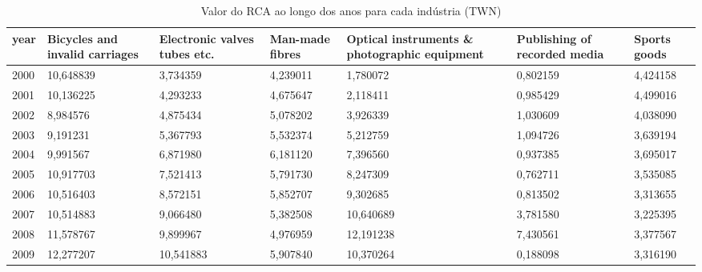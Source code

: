 \begin{table}
\centering
\caption{Valor do RCA ao longo dos anos para cada indústria (TWN)}
\begin{tabular}{p{1cm}p{2cm}p{2cm}p{2cm}p{2cm}p{2cm}p{2cm}}
\toprule
 year &  Bicycles and invalid carriages &  Electronic valves tubes etc. &  Man-made fibres &  Optical instruments \& photographic equipment &  Publishing of recorded media &  Sports goods \\
\midrule
 2000 &                       10,648839 &                      3,734359 &         4,239011 &                                      1,780072 &                      0,802159 &      4,424158 \\
 2001 &                       10,136225 &                      4,293233 &         4,675647 &                                      2,118411 &                      0,985429 &      4,499016 \\
 2002 &                        8,984576 &                      4,875434 &         5,078202 &                                      3,926339 &                      1,030609 &      4,038090 \\
 2003 &                        9,191231 &                      5,367793 &         5,532374 &                                      5,212759 &                      1,094726 &      3,639194 \\
 2004 &                        9,991567 &                      6,871980 &         6,181120 &                                      7,396560 &                      0,937385 &      3,695017 \\
 2005 &                       10,917703 &                      7,521413 &         5,791730 &                                      8,247309 &                      0,762711 &      3,535085 \\
 2006 &                       10,516403 &                      8,572151 &         5,852707 &                                      9,302685 &                      0,813502 &      3,313655 \\
 2007 &                       10,514883 &                      9,066480 &         5,382508 &                                     10,640689 &                      3,781580 &      3,225395 \\
 2008 &                       11,578767 &                      9,899967 &         4,976959 &                                     12,191238 &                      7,430561 &      3,377567 \\
 2009 &                       12,277207 &                     10,541883 &         5,907840 &                                     10,370264 &                      0,188098 &      3,316190 \\

\end{tabular}
\end{table}
